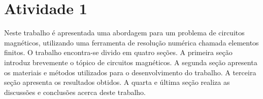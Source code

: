 \chapter{Atividade 1}
\label{chap1}
Neste trabalho é apresentada uma abordagem para um problema de circuitos magnéticos, utilizando uma ferramenta de resolução numérica chamada elementos finitos. O trabalho encontra-se divido em quatro seções. A primeira seção introduz brevemente o tópico de circuitos magnéticos. A segunda seção apresenta os materiais e métodos utilizados para o desenvolvimento do trabalho. A terceira seção apresenta os resultados obtidos. A quarta e última seção realiza as discussões e conclusões acerca deste trabalho.
\newpage
\pagebreak

\newpage
\pagebreak

\newpage
\pagebreak

\newpage
\pagebreak

